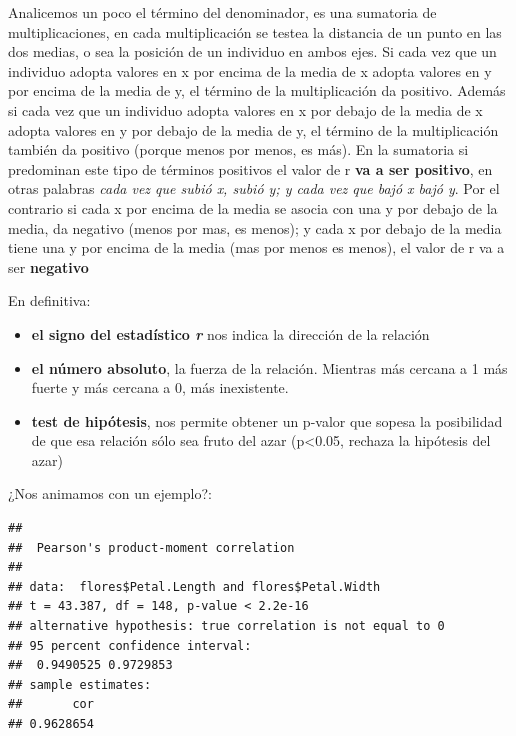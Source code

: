 \documentclass[
]{book}
\newenvironment{Shaded}{\begin{snugshade}}{\end{snugshade}}
\newcommand{\AttributeTok}[1]{\textcolor[rgb]{0.77,0.63,0.00}{#1}}
\newcommand{\FunctionTok}[1]{\textcolor[rgb]{0.00,0.00,0.00}{#1}}
\newcommand{\NormalTok}[1]{#1}
\newcommand{\SpecialCharTok}[1]{\textcolor[rgb]{0.00,0.00,0.00}{#1}}
\newcommand{\StringTok}[1]{\textcolor[rgb]{0.31,0.60,0.02}{#1}}
\begin{document}
Analicemos un poco el término del denominador, es una sumatoria de multiplicaciones, en cada multiplicación se testea la distancia de un punto en las dos medias, o sea la posición de un individuo en ambos ejes.
Si cada vez que un individuo adopta valores en x por encima de la media de x adopta valores en y por encima de la media de y, el término de la multiplicación da positivo. Además si cada vez que un individuo adopta valores en x por debajo de la media de x adopta valores en y por debajo de la media de y, el término de la multiplicación también da positivo (porque menos por menos, es más). En la sumatoria si predominan este tipo de términos positivos el valor de r \textbf{va a ser positivo}, en otras palabras \emph{cada vez que subió x, subió y; y cada vez que bajó x bajó y}. Por el contrario si cada x por encima de la media se asocia con una y por debajo de la media, da negativo (menos por mas, es menos); y cada x por debajo de la media tiene una y por encima de la media (mas por menos es menos), el valor de r va a ser \textbf{negativo}

En definitiva:

\begin{itemize}
\item
  \textbf{el signo del estadístico \emph{r}} nos indica la dirección de la relación
\item
  \textbf{el número absoluto}, la fuerza de la relación. Mientras más cercana a 1 más fuerte y más cercana a 0, más inexistente.
\item
  \textbf{test de hipótesis}, nos permite obtener un p-valor que sopesa la posibilidad de que esa relación sólo sea fruto del azar (p\textless0.05, rechaza la hipótesis del azar)
\end{itemize}

¿Nos animamos con un ejemplo?:

\begin{Shaded}
\end{Shaded}

\begin{verbatim}
## 
##  Pearson's product-moment correlation
## 
## data:  flores$Petal.Length and flores$Petal.Width
## t = 43.387, df = 148, p-value < 2.2e-16
## alternative hypothesis: true correlation is not equal to 0
## 95 percent confidence interval:
##  0.9490525 0.9729853
## sample estimates:
##       cor 
## 0.9628654
\end{verbatim}
\end{document}
